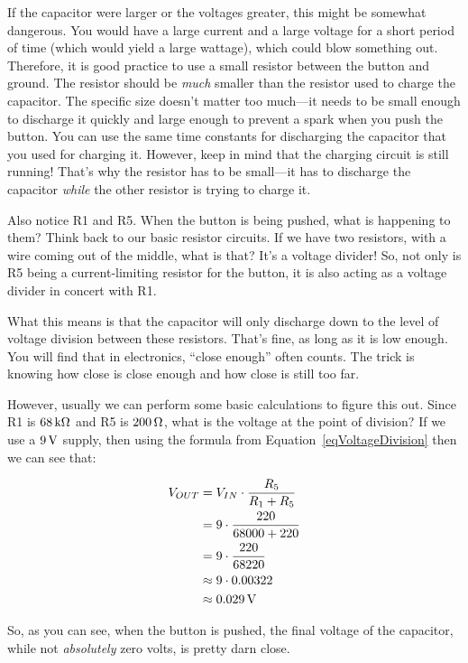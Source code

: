 If the capacitor were larger or the voltages greater, this might be somewhat dangerous.
You would have a large current and a large voltage for a short period of time (which would yield a large wattage), which could blow something out.
Therefore, it is good practice to use a small resistor between the button and ground.
The resistor should be \emph{much} smaller than the resistor used to charge the capacitor.
The specific size doesn't matter too much---it needs to be small enough to discharge it quickly and large enough to prevent a spark when you push the button.
You can use the same time constants for discharging the capacitor that you used for charging it.
However, keep in mind that the charging circuit is still running!
That's why the resistor has to be small---it has to discharge the capacitor \emph{while} the other resistor is trying to charge it.

Also notice R1 and R5.  
When the button is being pushed, what is happening to them?
Think back to our basic resistor circuits.  
If we have two resistors, with a wire coming out of the middle, what is that?
It's a voltage divider!
So, not only is R5 being a current-limiting resistor for the button, it is also acting as a voltage divider in concert with R1.

What this means is that the capacitor will only discharge down to the level of voltage division between these resistors. 
That's fine, as long as it is low enough.
You will find that in electronics, ``close enough'' often counts.
The trick is knowing how close is close enough and how close is still too far.

However, usually we can perform some basic calculations to figure this out.
Since R1 is $68\,\si{\kilo\ohm}$ and R5 is $200\,\si{\ohm}$, what is the voltage at the point of division?
If we use a $9\,\si{\volt}$ supply, then using the formula from Equation~\ref{eqVoltageDivision} then we can see that:

\begin{align*}
V_{OUT} &= V_{IN} \cdot \frac{R_5}{R_1 + R_5} \\
 &= 9 \cdot \frac{220}{68000 + 220} \\
 &= 9 \cdot \frac{220}{68220} \\
 &\approx 9 \cdot 0.00322 \\
 &\approx 0.029\,\si{\volt}
\end{align*}

So, as you can see, when the button is pushed, the final voltage of the capacitor, while not \emph{absolutely} zero volts, is pretty darn close.

